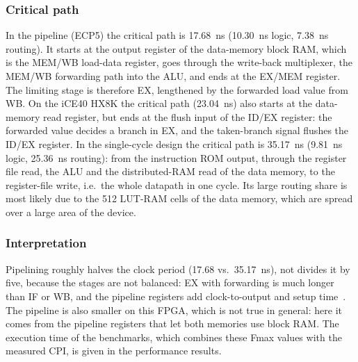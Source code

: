 \subsubsection{Critical path}
In the pipeline (ECP5) the critical path is 17.68~ns (10.30~ns logic,
7.38~ns routing). It starts at the output register of the data-memory block
RAM, which is the MEM/WB load-data register, goes through the write-back
multiplexer, the MEM/WB forwarding path into the ALU, and ends at the EX/MEM
register. The limiting stage is therefore EX, lengthened by the forwarded
load value from WB. On the iCE40 HX8K the critical path (23.04~ns) also starts
at the data-memory read register, but ends at the flush input of the ID/EX
register: the forwarded value decides a branch in EX, and the taken-branch
signal flushes the ID/EX register. In the single-cycle design the critical
path is 35.17~ns (9.81~ns logic, 25.36~ns routing): from the instruction ROM
output, through the register file read, the ALU and the distributed-RAM read of
the data memory, to the register-file write, i.e.\ the whole datapath in one
cycle. Its large routing share is most likely due to the 512 LUT-RAM cells
of the data memory, which are spread over a large area of the device.

\subsubsection{Interpretation}
Pipelining roughly halves the clock period (17.68 vs.\ 35.17~ns), not divides
it by five, because the stages are not balanced: EX with forwarding is much
longer than IF or WB, and the pipeline registers add clock-to-output and setup
time~\cite{yogeshHennessyQA,yogeshHartstein2002}. The pipeline is also smaller
on this FPGA, which is not true in general: here it comes from the pipeline
registers that let both memories use block RAM. The execution time of the
benchmarks, which combines these Fmax values with the measured CPI, is given
in the performance results.
